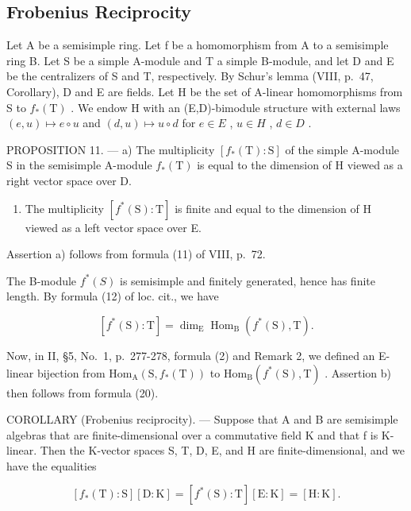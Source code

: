 \subsection{Frobenius Reciprocity}

Let A be a semisimple ring. Let f be a homomorphism from A to a semisimple ring B. Let S be a simple A-module and T a simple B-module, and let D and E be the centralizers of S and T, respectively. By Schur's lemma (VIII, p.~47, Corollary), D and E are fields. Let H be the set of A-linear homomorphisms from S to \(f_{*}(\mathrm{T})\) . We endow H with an (E,D)-bimodule structure with external laws \((e,u)\mapsto e\circ u\) and \((d,u)\mapsto u\circ d\) for \(e\in E\) , \(u\in H\) , \(d\in D\) .

PROPOSITION 11. --- a) The multiplicity \([f_{*}(\mathrm{T}):\mathrm{S}]\) of the simple A-module S in the semisimple A-module \(f_{*}(\mathrm{T})\) is equal to the dimension of H viewed as a right vector space over D.

\begin{enumerate}
\def\labelenumi{\alph{enumi})}
\setcounter{enumi}{1}
\tightlist
\item
  The multiplicity \([f^{*}(\mathrm{S}):\mathrm{T}]\) is finite and equal to the dimension of H viewed as a left vector space over E.
\end{enumerate}

Assertion a) follows from formula (11) of VIII, p.~72.

The B-module \(f^{*}(S)\) is semisimple and finitely generated, hence has finite length. By formula (12) of loc. cit., we have

\[
[ f ^ {*} (\mathrm{S}): \mathrm{T} ] = \dim_ {\mathrm{E}} \operatorname{Hom} _ {\mathrm{B}} (f ^ {*} (\mathrm{S}), \mathrm{T}).\tag{20}
\]

Now, in II, §5, No.~1, p.~277-278, formula (2) and Remark 2, we defined an E-linear bijection from \(\mathrm{Hom}_{\mathrm{A}}(\mathrm{S},f_{*}(\mathrm{T}))\) to \(\mathrm{Hom}_{\mathrm{B}}(f^{*}(\mathrm{S}),\mathrm{T})\) . Assertion b) then follows from formula (20).

COROLLARY (Frobenius reciprocity). --- Suppose that A and B are semisimple algebras that are finite-dimensional over a commutative field K and that f is K-linear. Then the K-vector spaces S, T, D, E, and H are finite-dimensional, and we have the equalities

\[
[ f _ {*} (\mathrm{T}): \mathrm{S} ] [ \mathrm{D}: \mathrm{K} ] = [ f ^ {*} (\mathrm{S}): \mathrm{T} ] [ \mathrm{E}: \mathrm{K} ] = [ \mathrm{H}: \mathrm{K} ].\tag{21}
\]

